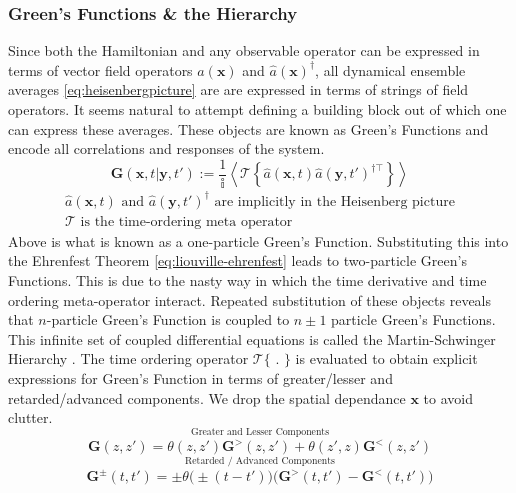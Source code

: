 \documentclass{article}[12pt]
\numberwithin{equation}{section}
\begin{document}
\subsubsection{Green's Functions \& the Hierarchy}
\vspace{-10pt}
Since both the Hamiltonian and any observable operator can be expressed in terms
of vector field operators $\hat{a}(\mathbf{x})$ and $\hat{a}(\mathbf{x})^{\dagger}$, all
dynamical ensemble averages \eqref{eq:heisenbergpicture} are are expressed in terms
of strings of field operators. It seems natural to attempt defining a building
block out of which one can express these averages. These objects are known as
Green's Functions and encode all correlations and responses of the system.
\begin{equation}\label{eq:green-function}
\mathbf{G}(\mathbf{x},t|\mathbf{y},t'):=
\frac{1}{\mathbb{i}}
\left\langle\mathcal{T}\left\{
\hat{a}(\mathbf{x},t)
\hat{a}(\mathbf{y},t')^{\dagger\top}
\right\}\right\rangle
\end{equation}
\vspace{-40pt}
\begin{align*}
\hat{a}(\mathbf{x},t)\text{ and } \hat{a}(\mathbf{y},t')^{\dagger}
\text{ are implicitly in the Heisenberg picture}\\
\mathcal{T}
\text{ is the time-ordering meta operator}\qquad\qquad\quad
\end{align*}
Above is what is known as a one-particle Green's Function. Substituting this
 into the Ehrenfest Theorem \eqref{eq:liouville-ehrenfest} leads to two-particle Green's Functions. This
is due to the nasty way in which the time derivative and time ordering meta-operator
interact. Repeated substitution of these objects reveals that $n$-particle
Green's Function is coupled to $n\pm1$ particle Green's Functions. This infinite set of coupled
differential equations is called the Martin-Schwinger Hierarchy \cite{stefanucci2013}. The time ordering operator $\mathcal{T}\{\,\,.\,\,\}$ is evaluated to obtain
explicit expressions for Green's Function in terms of greater/lesser and
retarded/advanced components. We drop the spatial dependance $\mathbf{x}$ to avoid
clutter.
\begin{equation}\label{eq:greater-lesser}
\overset{\text{Greater and Lesser Components}}
{\mathbf{G}(z,z')=
\theta(z,z')\mathbf{G}^{>}(z,z')+\theta(z',z)\mathbf{G}^{<}(z,z')}
\end{equation}
\begin{equation}\label{eq:retarded-advanced}
\overset{\text{Retarded / Advanced Components}}
{\mathbf{G}^{\pm}(t,t')=
\pm\theta\Big(\pm(t-t')\Big)\Big(\mathbf{G}^{>}(t,t')-\mathbf{G}^{<}(t,t')\Big)}
\end{equation}
\end{document}

